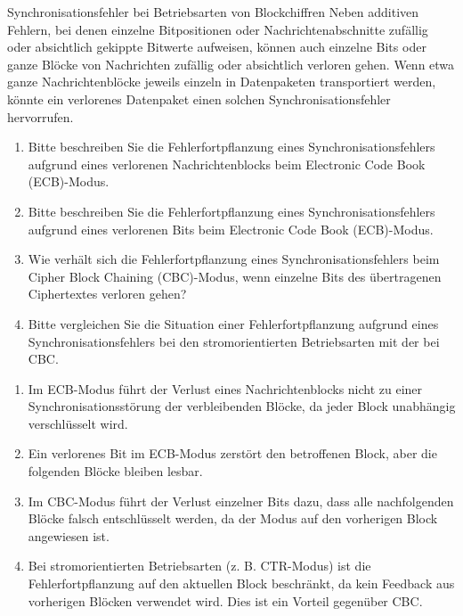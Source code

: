 \documentclass{article}
\begin{document}
\begin{exercise}{Synchronisationsfehler bei Betriebsarten von Blockchiffren}
  Neben additiven Fehlern, bei denen einzelne Bitpositionen oder Nachrichtenabschnitte zufällig oder absichtlich gekippte Bitwerte aufweisen, können auch einzelne Bits oder ganze Blöcke von Nachrichten zufällig oder absichtlich verloren gehen. Wenn etwa ganze Nachrichtenblöcke jeweils einzeln in Datenpaketen transportiert werden, könnte ein verlorenes Datenpaket einen solchen Synchronisationsfehler hervorrufen.
  \begin{enumerate}
    \item Bitte beschreiben Sie die Fehlerfortpflanzung eines Synchronisationsfehlers aufgrund eines verlorenen Nachrichtenblocks beim Electronic Code Book (ECB)-Modus.
    \item Bitte beschreiben Sie die Fehlerfortpflanzung eines Synchronisationsfehlers aufgrund eines verlorenen Bits beim Electronic Code Book (ECB)-Modus.
    \item Wie verhält sich die Fehlerfortpflanzung eines Synchronisationsfehlers beim Cipher Block Chaining (CBC)-Modus, wenn einzelne Bits des übertragenen Ciphertextes verloren gehen?
    \item Bitte vergleichen Sie die Situation einer Fehlerfortpflanzung aufgrund eines Synchronisationsfehlers bei den stromorientierten Betriebsarten mit der bei CBC.
  \end{enumerate}

  \begin{solution}
    \begin{enumerate}
        \item Im ECB-Modus führt der Verlust eines Nachrichtenblocks nicht zu einer Synchronisationsstörung der verbleibenden Blöcke, da jeder Block unabhängig verschlüsselt wird.
        \item Ein verlorenes Bit im ECB-Modus zerstört den betroffenen Block, aber die folgenden Blöcke bleiben lesbar.
        \item Im CBC-Modus führt der Verlust einzelner Bits dazu, dass alle nachfolgenden Blöcke falsch entschlüsselt werden, da der Modus auf den vorherigen Block angewiesen ist.
        \item Bei stromorientierten Betriebsarten (z. B. CTR-Modus) ist die Fehlerfortpflanzung auf den aktuellen Block beschränkt, da kein Feedback aus vorherigen Blöcken verwendet wird. Dies ist ein Vorteil gegenüber CBC.
    \end{enumerate}
  \end{solution}
\end{exercise}
\end{document}
